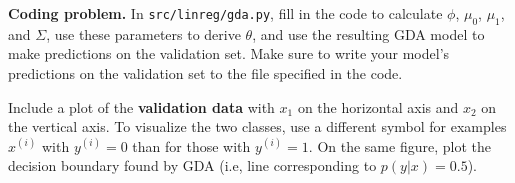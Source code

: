 \item {} \textbf{Coding problem.}
In \texttt{src/linreg/gda.py}, fill in the code to
calculate $\phi$, $\mu_{0}$, $\mu_{1}$, and $\Sigma$, use these parameters
to derive $\theta$, and use the resulting GDA model to make predictions on the
validation set. Make sure to write your model's predictions on
the validation set to the file specified in the code.

Include a plot of the \textbf{validation data} with $x_1$ on the horizontal axis and $x_2$ on the vertical axis.
To visualize the two classes, use a different symbol for examples $x^{(i)}$
with $y^{(i)} = 0$ than for those with $y^{(i)} = 1$. On the same figure, plot the decision boundary
found by GDA (i.e, line corresponding to $p(y|x) = 0.5$).

